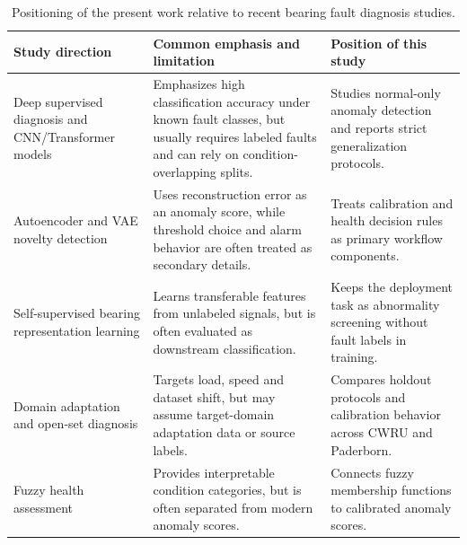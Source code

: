
\begin{table}[t]
\centering
\caption{Positioning of the present work relative to recent bearing fault diagnosis studies.}
\label{tab:literature_positioning}
\small
\setlength{\tabcolsep}{5pt}
\renewcommand{\arraystretch}{1.18}
\begin{tabularx}{\textwidth}{>{\raggedright\arraybackslash}p{3.2cm}
>{\raggedright\arraybackslash}X
>{\raggedright\arraybackslash}X}
\toprule
Study direction & Common emphasis and limitation & Position of this study \\
\midrule
Deep supervised diagnosis and CNN/Transformer models & Emphasizes high classification accuracy under known fault classes, but usually requires labeled faults and can rely on condition-overlapping splits. & Studies normal-only anomaly detection and reports strict generalization protocols. \\
Autoencoder and VAE novelty detection & Uses reconstruction error as an anomaly score, while threshold choice and alarm behavior are often treated as secondary details. & Treats calibration and health decision rules as primary workflow components. \\
Self-supervised bearing representation learning & Learns transferable features from unlabeled signals, but is often evaluated as downstream classification. & Keeps the deployment task as abnormality screening without fault labels in training. \\
Domain adaptation and open-set diagnosis & Targets load, speed and dataset shift, but may assume target-domain adaptation data or source labels. & Compares holdout protocols and calibration behavior across CWRU and Paderborn. \\
Fuzzy health assessment & Provides interpretable condition categories, but is often separated from modern anomaly scores. & Connects fuzzy membership functions to calibrated anomaly scores. \\
\bottomrule
\end{tabularx}
\end{table}
